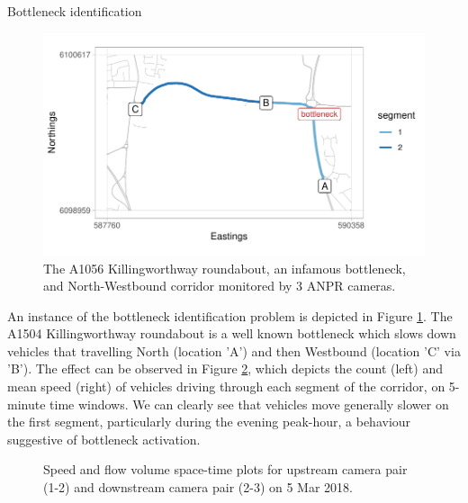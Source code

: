\documentclass[final]{beamer}
\newlength{\colwidth}
\begin{document}
\begin{frame}[t]
\begin{columns}[t]
\begin{column}{\colwidth}
\begin{block}{Bottleneck identification }
    \begin{figure}
      \centering
      \includegraphics[width=0.95\linewidth]{MOTIVATING-EXAMPLE-map.pdf}
      \caption{The A1056 Killingworthway roundabout, an infamous bottleneck,
               and North-Westbound corridor monitored by 3 ANPR cameras.}
               \label{fig:motivating_example_map}
    \end{figure}

    An instance of the bottleneck identification problem is depicted in
    Figure \ref{fig:motivating_example_map}. The A1504 Killingworthway
    roundabout is a well known bottleneck which slows down vehicles that
    travelling North (location 'A') and then Westbound (location 'C' via 'B').
    The effect can be observed in Figure \ref{fig:motivating_example_1dayplots},
    which depicts the count (left) and mean speed (right) of vehicles driving
    through each segment of the corridor, on 5-minute time windows. We can
    clearly see that vehicles move generally slower on the first segment,
    particularly during the evening peak-hour, a behaviour suggestive of
    bottleneck activation.

    \begin{figure}
      \centering
      \caption{Speed and flow volume space-time plots for upstream camera pair
               (1-2) and downstream camera pair (2-3) on 5 Mar 2018.}
      \label{fig:motivating_example_1dayplots}
    \end{figure}


\end{block}
\end{column}
\end{columns}
\end{frame}
\end{document}
